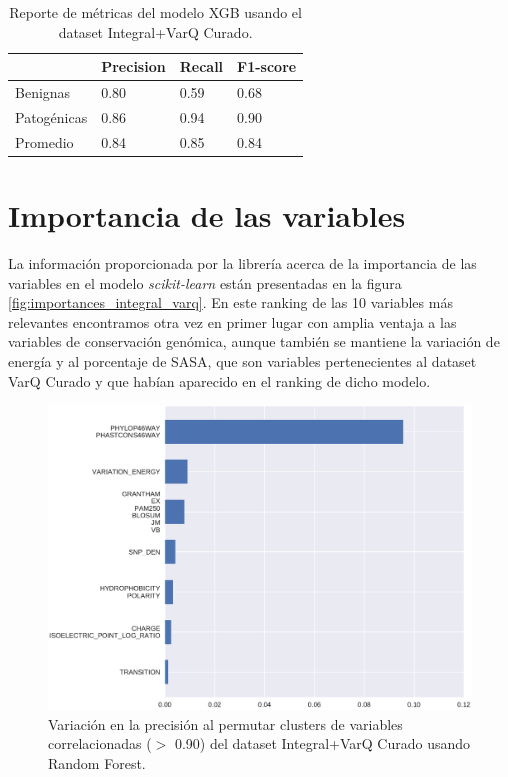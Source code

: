 \begin{table}[H]
\centering
\begin{tabular}{|l|l|l|l|}
\hline
             & Precision & Recall & F1-score \\ \hline
Benignas     & 0.80      & 0.59   & 0.68     \\ \hline
Patogénicas  & 0.86      & 0.94   & 0.90     \\ \hline
Promedio     & 0.84      & 0.85   & 0.84     \\ \hline
\end{tabular}
\caption{Reporte de métricas del modelo XGB usando el dataset Integral+VarQ Curado.}
\label{tab:metrics_integral_varq_xgb}
\end{table}



\section{Importancia de las variables}
La información proporcionada por la librería acerca de la importancia de las variables en el modelo \textit{scikit-learn} están presentadas en la figura \ref{fig:importances_integral_varq}. En este ranking de las 10 variables más relevantes encontramos otra vez en primer lugar con amplia ventaja a las variables de conservación genómica, aunque también se mantiene la variación de energía y al porcentaje de SASA, que son variables pertenecientes al dataset VarQ Curado y que habían aparecido en el ranking de dicho modelo. 

\begin{figure}[H]
    \centering
    \includegraphics[scale=0.6]{documents/latex/figures/3/integral_varq/integral_varq_importance_cluster.pdf}
    \caption{Variación en la precisión al permutar clusters de variables correlacionadas ($>$ 0.90) del dataset Integral+VarQ Curado usando Random Forest.}
    \label{fig:importance_cluster_integral_varq}
\end{figure}

